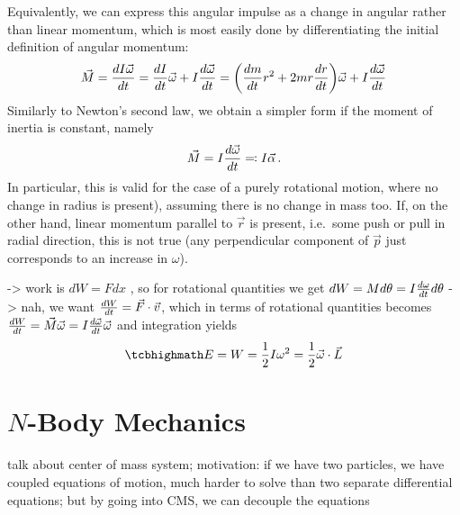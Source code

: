 \documentclass[../class_mech_main.tex]{subfiles}
\begin{document}

Equivalently, we can express this angular impulse as a change in angular rather than linear momentum, which is most easily done by differentiating the initial definition of angular momentum:
\begin{align}
	\vec{M} = \dv{I \vec{\omega}}{t} = \dv{I}{t} \vec{\omega} + I \dv{\vec{\omega}}{t}
	= \qty(\dv{m}{t} r^2 + 2 m r \dv{r}{t}) \vec{\omega} + I \dv{\vec{\omega}}{t}
\end{align}
Similarly to Newton's second law, we obtain a simpler form if the moment of inertia is constant, namely
\begin{equation}
	\vec{M} = I \dv{\vec{\omega}}{t} \eqqcolon I \vec{\alpha} \, .
\end{equation}
In particular, this is valid for the case of a purely rotational motion, where no change in radius is present), assuming there is no change in mass too. If, on the other hand, linear momentum parallel to $\vec{r}$ is present, i.e.~some push or pull in radial direction, this is not true (any perpendicular component of $\vec{p}$ just corresponds to an increase in $\omega$).



-> work is $dW = F dx$ , so for rotational quantities we get $dW = M d\theta = I \dv{\omega}{t} d\theta$  -> nah, we want $\dv{W}{t} = \vec{F} \cdot \vec{v}$, which in terms of rotational quantities becomes $\dv{W}{t} = \vec{M} \vec{\omega} = I \dv{\vec{\omega}}{t} \vec{\omega}$ and integration yields
\begin{equation}
	\eqbox{
		E = W = \frac{1}{2} I \omega^2 = \frac{1}{2} \vec{\omega} \cdot \vec{L}
	}
\end{equation}



	\section{$N$-Body Mechanics}
	\label{sec:n_body_mechanics}
talk about center of mass system; motivation: if we have two particles, we have coupled equations of motion, much harder to solve than two separate differential equations; but by going into CMS, we can decouple the equations
\end{document}
